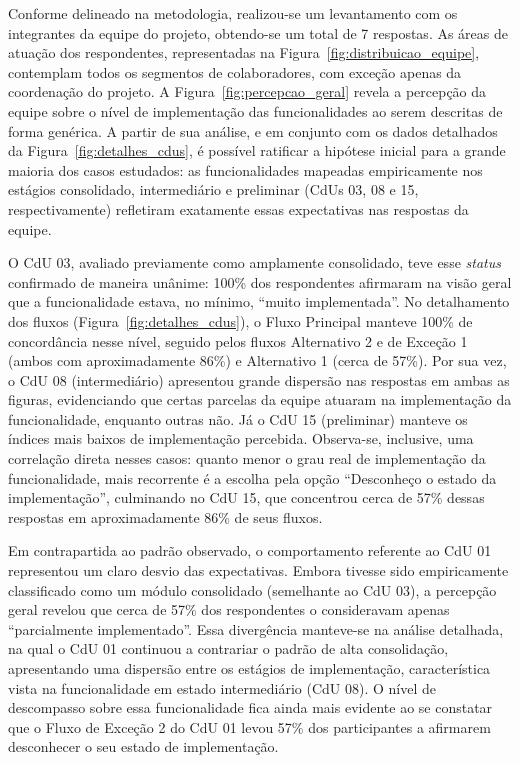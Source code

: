 



Conforme delineado na metodologia, realizou-se um levantamento com os integrantes da equipe do projeto, obtendo-se um total de 7 respostas. As áreas de atuação dos respondentes, representadas na Figura~\ref{fig:distribuicao_equipe}, contemplam todos os segmentos de colaboradores, com exceção apenas da coordenação do projeto. A Figura~\ref{fig:percepcao_geral} revela a percepção da equipe sobre o nível de implementação das funcionalidades ao serem descritas de forma genérica. A partir de sua análise, e em conjunto com os dados detalhados da Figura~\ref{fig:detalhes_cdus}, é possível ratificar a hipótese inicial para a grande maioria dos casos estudados: as funcionalidades mapeadas empiricamente nos estágios consolidado, intermediário e preliminar (CdUs 03, 08 e 15, respectivamente) refletiram exatamente essas expectativas nas respostas da equipe.

O CdU 03, avaliado previamente como amplamente consolidado, teve esse \textit{status} confirmado de maneira unânime: 100\% dos respondentes afirmaram na visão geral que a funcionalidade estava, no mínimo, ``muito implementada''. No detalhamento dos fluxos (Figura~\ref{fig:detalhes_cdus}), o Fluxo Principal manteve 100\% de concordância nesse nível, seguido pelos fluxos Alternativo 2 e de Exceção 1 (ambos com aproximadamente 86\%) e Alternativo 1 (cerca de 57\%). Por sua vez, o CdU 08 (intermediário) apresentou grande dispersão nas respostas em ambas as figuras, evidenciando que certas parcelas da equipe atuaram na implementação da funcionalidade, enquanto outras não. Já o CdU 15 (preliminar) manteve os índices mais baixos de implementação percebida. Observa-se, inclusive, uma correlação direta nesses casos: quanto menor o grau real de implementação da funcionalidade, mais recorrente é a escolha pela opção ``Desconheço o estado da implementação'', culminando no CdU 15, que concentrou cerca de 57\% dessas respostas em aproximadamente 86\% de seus fluxos.

Em contrapartida ao padrão observado, o comportamento referente ao CdU 01 representou um claro desvio das expectativas. Embora tivesse sido empiricamente classificado como um módulo consolidado (semelhante ao CdU 03), a percepção geral revelou que cerca de 57\% dos respondentes o consideravam apenas ``parcialmente implementado''. Essa divergência manteve-se na análise detalhada, na qual o CdU 01 continuou a contrariar o padrão de alta consolidação, apresentando uma dispersão entre os estágios de implementação, característica vista na funcionalidade em estado intermediário (CdU 08). O nível de descompasso sobre essa funcionalidade fica ainda mais evidente ao se constatar que o Fluxo de Exceção 2 do CdU 01 levou 57\% dos participantes a afirmarem desconhecer o seu estado de implementação.

